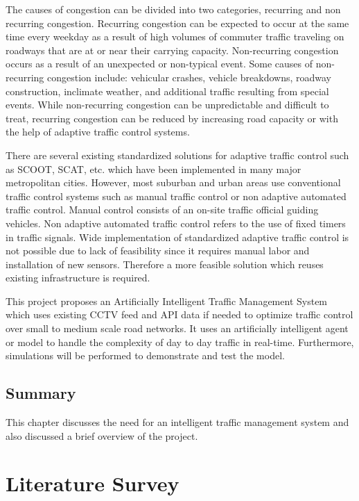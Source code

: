 \documentclass[openany,12pt]{report}
\begin{document}
	The causes of congestion can be divided into two categories, recurring and non recurring congestion. Recurring congestion can be expected to occur at the same time every weekday as a result of high volumes of commuter traffic traveling on roadways that are at or near their carrying capacity. Non-recurring congestion occurs as a result of an unexpected or non-typical event. Some causes of non-recurring congestion include: vehicular crashes, vehicle breakdowns, roadway construction, inclimate weather, and additional traffic resulting from special events. While non-recurring congestion can be unpredictable and difficult to treat, recurring congestion can be reduced by increasing road capacity or with the help of adaptive traffic control systems.
	
	There are several existing standardized solutions for adaptive traffic control such as SCOOT\cite{paper5}, SCAT\cite{paper6}, etc. which have been implemented in many major metropolitan cities. However, most suburban and urban areas use conventional traffic control systems such as manual traffic control or non adaptive automated traffic control. Manual control consists of an on-site traffic official guiding vehicles. Non adaptive automated traffic control refers to the use of fixed timers in traffic signals. Wide implementation of standardized adaptive traffic control is not possible due to lack of feasibility since it requires manual labor and installation of new sensors. Therefore a more feasible solution which reuses existing infrastructure is required.
	
	This project proposes an Artificially Intelligent Traffic Management System which uses existing CCTV feed and API data if needed to optimize traffic control over small to medium scale road networks. It uses an artificially intelligent agent or model to handle the complexity of day to day traffic in real-time. Furthermore, simulations will be performed to demonstrate and test the model.\\
	
	\section{Summary}
	\hspace*{0.5in}This chapter discusses the need for an intelligent traffic management system and also discussed a brief overview of the project.\\
	\chapter{Literature Survey}
	
\end{document}
